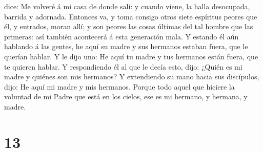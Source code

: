dice: Me volveré á mi casa de donde salí: y cuando viene, la halla
desocupada, barrida y adornada.  Entonces va, y toma
consigo otros siete espíritus peores que él, y entrados, moran allí; y
son peores las cosas últimas del tal hombre que las primeras: así
también acontecerá á esta generación mala.  Y estando él
aún hablando á las gentes, he aquí su madre y sus hermanos estaban
fuera, que le querían hablar.  Y le dijo uno: He aquí tu
madre y tus hermanos están fuera, que te quieren hablar.  Y
respondiendo él al que le decía esto, dijo: ¿Quién es mi madre y quiénes
son mis hermanos?  Y extendiendo su mano hacia sus
discípulos, dijo: He aquí mi madre y mis hermanos.  Porque
todo aquel que hiciere la voluntad de mi Padre que está en los cielos,
ese es mi hermano, y hermana, y madre.

\hypertarget{section-12}{%
\section{13}\label{section-12}}

